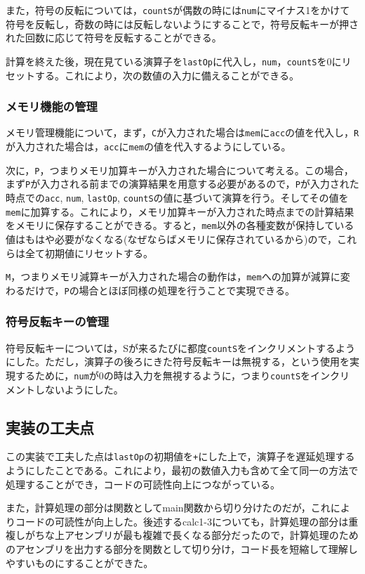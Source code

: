 \documentclass[a4paper]{jsarticle}
\newcommand{\var}[1]{\texttt{#1}}
\begin{document}
また，符号の反転については，\var{countS}が偶数の時には\var{num}にマイナス1をかけて符号を反転し，奇数の時には反転しないようにすることで，符号反転キーが押された回数に応じて符号を反転することができる。

計算を終えた後，現在見ている演算子を\var{lastOp}に代入し，\var{num}，\var{countS}を0にリセットする。これにより，次の数値の入力に備えることができる。



\subsubsection{メモリ機能の管理}
メモリ管理機能について，まず，\var{C}が入力された場合は\var{mem}に\var{acc}の値を代入し，\var{R}が入力された場合は，\var{acc}に\var{mem}の値を代入するようにしている。

次に，\var{P}，つまりメモリ加算キーが入力された場合について考える。この場合，まず\var{P}が入力される前までの演算結果を用意する必要があるので，\var{P}が入力された時点での\var{acc}, \var{num}, \var{lastOp}, \var{countS}の値に基づいて演算を行う。そしてその値を\var{mem}に加算する。これにより，メモリ加算キーが入力された時点までの計算結果をメモリに保存することができる。すると，\var{mem}以外の各種変数が保持している値はもはや必要がなくなる(なぜならばメモリに保存されているから)ので，これらは全て初期値にリセットする。

\var{M}，つまりメモリ減算キーが入力された場合の動作は，\var{mem}への加算が減算に変わるだけで，\var{P}の場合とほぼ同様の処理を行うことで実現できる。

\subsubsection{符号反転キーの管理}
符号反転キーについては，Sが来るたびに都度\var{countS}をインクリメントするようにした。ただし，演算子の後ろにきた符号反転キーは無視する，という使用を実現するために，\var{num}が0の時は入力を無視するように，つまり\var{countS}をインクリメントしないようにした。

\subsection{実装の工夫点}
この実装で工夫した点は\var{lastOp}の初期値を\var{+}にした上で，演算子を遅延処理するようにしたことである。これにより，最初の数値入力も含めて全て同一の方法で処理することができ，コードの可読性向上につながっている。

また，計算処理の部分は関数としてmain関数から切り分けたのだが，これによりコードの可読性が向上した。後述するcalc1-3についても，計算処理の部分は重複しがちな上アセンブリが最も複雑で長くなる部分だったので，計算処理のためのアセンブリを出力する部分を関数として切り分け，コード長を短縮して理解しやすいものにすることができた。
\end{document}
